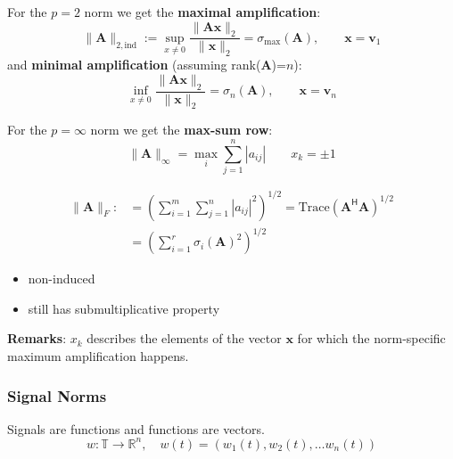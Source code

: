 \newpar{}
For the $p = 2$ norm we get the \textbf{maximal amplification}:
\noindent\begin{equation*}
    \|\mathbf{A}\|_{2,\mathrm{ind}}:=\sup_{x\neq0}\frac{\|\mathbf{Ax}\|_2}{\|\mathbf{x}\|_2}=\sigma_{\max}(\mathbf{A}),\qquad \mathbf{x}=\mathbf{v}_1
\end{equation*}
and \textbf{minimal amplification} (assuming rank($\mathbf{A}$)=$n$):
\noindent\begin{equation*}
    \inf_{x\neq0}\frac{\|\mathbf{Ax}\|_2}{\|\mathbf{x}\|_2}=\sigma_n(\mathbf{A}),\qquad \mathbf{x}=\mathbf{v}_n
\end{equation*}

\newpar{}
For the $p = \infty$ norm we get the \textbf{max-sum row}:
\begin{equation*}
    \|\mathbf{A}\|_\infty=\max_i\sum_{j=1}^n|a_{ij}|\qquad x_k=\pm 1
\end{equation*}


\noindent\begin{align*}
    \|\mathbf{A}\|_F: & ={\left(\sum_{i=1}^m\sum_{j=1}^n|a_{ij}|^2\right)}^{1/2}=\text{Trace}{(\mathbf{A}^{\mathsf{H}}\mathbf{A})}^{1/2} \\
                      & = {\left(\sum_{i=1}^r\sigma_i{(\mathbf{A})}^2\right)}^{1/2}
\end{align*}

\begin{itemize}
    \item non-induced
    \item still has submultiplicative property
\end{itemize}

\textbf{Remarks}: $x_k$ describes the elements of the vector $\mathbf{x}$ for which the norm-specific maximum amplification happens.

\subsubsection{Signal Norms}
Signals are functions and functions are vectors.
\noindent\begin{equation*}
    w:\mathbb{T}\rightarrow \mathbb{R}^n, \quad w(t)=(w_1(t), w_2(t), \ldots w_n(t))
\end{equation*}

